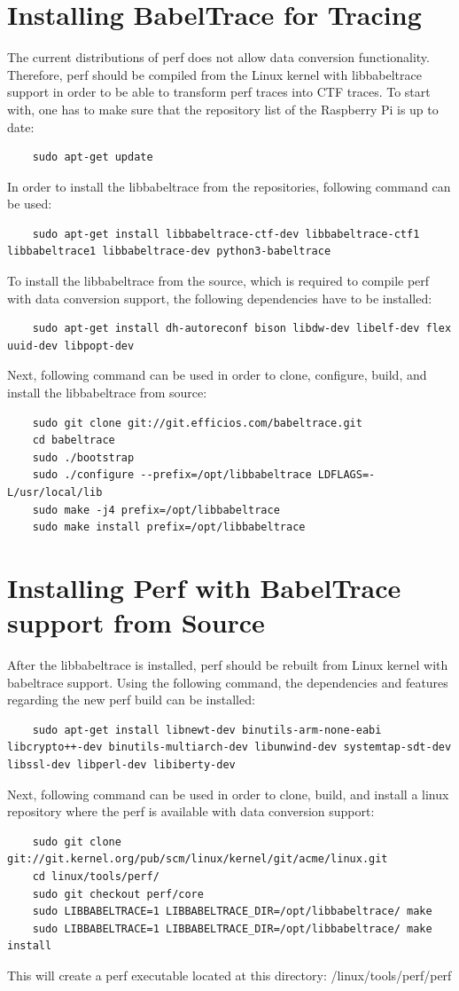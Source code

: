 \section{Installing BabelTrace for Tracing}
The current distributions of perf does not allow data conversion functionality. Therefore, perf should be compiled from the Linux kernel with libbabeltrace support in order to be able to transform perf traces into CTF traces. To start with, one has to make sure that the repository list of the Raspberry Pi is up to date:
\begin{lstlisting}
	sudo apt-get update
\end{lstlisting}
In order to install the libbabeltrace from the repositories, following command can be used:
\begin{lstlisting}
	sudo apt-get install libbabeltrace-ctf-dev libbabeltrace-ctf1 libbabeltrace1 libbabeltrace-dev python3-babeltrace
\end{lstlisting}
To install the libbabeltrace from the source, which is required to compile perf with data conversion support, the following dependencies have to be installed:
\begin{lstlisting}
	sudo apt-get install dh-autoreconf bison libdw-dev libelf-dev flex uuid-dev libpopt-dev 
\end{lstlisting}
Next, following command can be used in order to clone, configure, build, and install the libbabeltrace from source:
\begin{lstlisting}
	sudo git clone git://git.efficios.com/babeltrace.git
	cd babeltrace
	sudo ./bootstrap
	sudo ./configure --prefix=/opt/libbabeltrace LDFLAGS=-L/usr/local/lib
	sudo make -j4 prefix=/opt/libbabeltrace
	sudo make install prefix=/opt/libbabeltrace
\end{lstlisting}
\section{Installing Perf with BabelTrace support from Source}
After the libbabeltrace is installed, perf should be rebuilt from Linux kernel with babeltrace support. Using the following command, the dependencies and features regarding the new perf build can be installed:
\begin{lstlisting}
	sudo apt-get install libnewt-dev binutils-arm-none-eabi libcrypto++-dev binutils-multiarch-dev libunwind-dev systemtap-sdt-dev libssl-dev libperl-dev libiberty-dev
\end{lstlisting}
Next, following command can be used in order to clone, build, and install a linux repository where the perf is available with data conversion support:
\begin{lstlisting}
	sudo git clone git://git.kernel.org/pub/scm/linux/kernel/git/acme/linux.git
	cd linux/tools/perf/
	sudo git checkout perf/core
	sudo LIBBABELTRACE=1 LIBBABELTRACE_DIR=/opt/libbabeltrace/ make
	sudo LIBBABELTRACE=1 LIBBABELTRACE_DIR=/opt/libbabeltrace/ make install
\end{lstlisting}
This will create a perf executable located at this directory: /linux/tools/perf/perf
